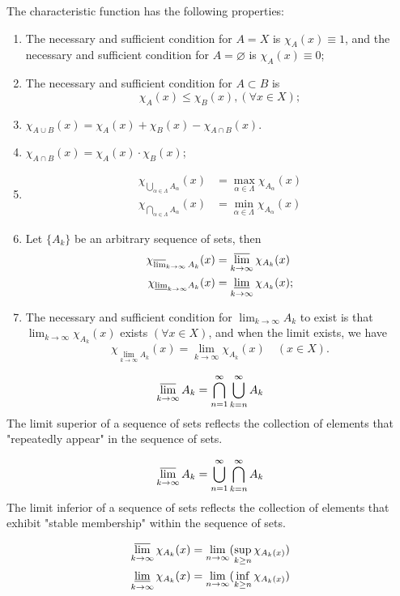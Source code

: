 \documentclass[../main.tex]{subfiles}
\begin{document}
The characteristic function has the following properties:
\begin{enumerate}
    \item The necessary and sufficient condition for $A = X$ is $\chi_A(x)\equiv1$, and the necessary and sufficient condition for $A=\varnothing$ is $\chi_A(x)\equiv0$;
    \item The necessary and sufficient condition for $A\subset B$ is
        $$
        \chi_A(x)\leq\chi_B(x),(\forall x\in X);
        $$
    \item $\chi_{A\cup B}(x)=\chi_A(x)+\chi_B(x)-\chi_{A\cap B}(x)$.
    \item $\chi_{A\cap B}(x)=\chi_A(x)\cdot \chi_B(x)$;
    \item \begin{align*}
        \chi_{\bigcup_{\alpha\in\Lambda}A_{\alpha}}(x) &= \max_{\alpha\in\Lambda}\chi_{A_\alpha}(x)\\
        \chi_{\bigcap_{\alpha\in\Lambda}A_{\alpha}}(x) &= \min_{\alpha\in\Lambda}\chi_{A_\alpha}(x)
    \end{align*}
    \item Let $\{A_k\}$ be an arbitrary sequence of sets, then \begin{align*}
        \chi_{\varlimsup_{k \to \infty} A_k}(x)&=\varlimsup_{k \to \infty}\chi_{A_k}(x)\\
        \chi_{\underline{\lim}_{k \to \infty} A_k}(x)&=\varliminf_{k \to \infty}\chi_{A_k}(x);\\
    \end{align*}
    \item The necessary and sufficient condition for $\lim_{k \to \infty} A_k$ to exist is that $\lim_{k \to \infty} \chi_{A_k}(x)$ exists $(\forall x \in X)$, and when the limit exists, we have
    $$
    \chi_{\lim_{k \to \infty} A_k}(x)=\lim_{k \to \infty} \chi_{A_k}(x)\quad (x \in X).
    $$
\end{enumerate}

\begin{green}

$$
\varlimsup_{k\to \infty}A_k = \bigcap_{n=1}^{\infty}\bigcup_{k=n}^{\infty}A_k
$$
The limit superior of a sequence of sets reflects the collection of elements that "repeatedly appear" in the sequence of sets.

$$
\varlimsup_{k\to \infty}A_k = \bigcup_{n=1}^{\infty}\bigcap_{k=n}^{\infty}A_k
$$
The limit inferior of a sequence of sets reflects the collection of elements that exhibit "stable membership" within the sequence of sets.

\begin{align*}
\varlimsup_{k\to\infty}\chi_{A_k}(x)&=\lim_{n\to\infty}(\sup_{k\ge n}\chi_{A_k(x)})\\
\varliminf_{k\to\infty}\chi_{A_k}(x)&=\lim_{n\to\infty}(\inf_{k\ge n}\chi_{A_k(x)})
\end{align*}
\end{green}
\end{document}
